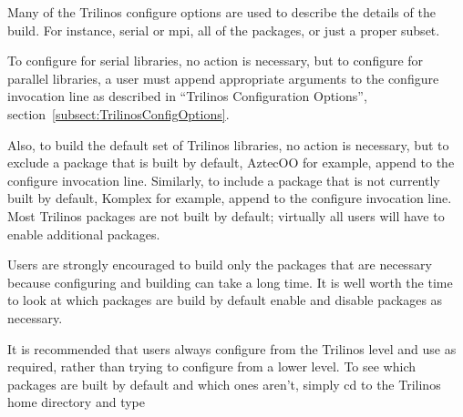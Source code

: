 Many of the Trilinos configure options are used to describe the details of the
build.  For
instance, serial or mpi, all of the packages, or just a proper subset.

To configure for serial libraries, no action is necessary,
but to configure for parallel libraries, a user must append appropriate
arguments to the configure invocation line as described in ``Trilinos
Configuration Options'', section~\ref{subsect:TrilinosConfigOptions}.

Also, to build the default set of Trilinos libraries, no action is
necessary, but to exclude a package that is built by default, AztecOO for
example, append \newline {} to the configure
invocation  line.  Similarly, to include a package that is not currently built
by default, Komplex for example, append  to
the configure invocation line.  Most Trilinos packages are not built by
default; virtually all users will have to enable additional packages.

\begin{minipage}[c]{\textwidth}
\begin{minipage}[l]{.6\textwidth}

Users are strongly encouraged to build
only the packages that are necessary because configuring and
building can take a long time.  It is well worth the time to look at which
packages are build by default enable and disable packages as necessary.
\end{minipage}\hfill
{}
\end{minipage}

It is recommended that users always configure
from the Trilinos level and use  as
required, rather than trying to configure from a lower level.  To see which
packages are built by default and which ones aren't, simply cd to the Trilinos home directory and type 


